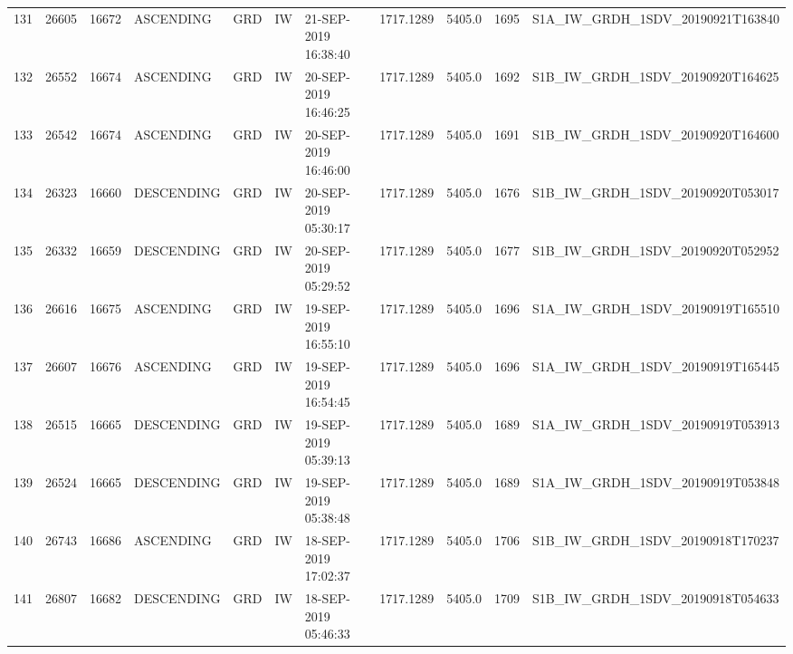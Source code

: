 \begin{tabular}{lrrllllllll}
131 &  26605 &   16672 &   ASCENDING &          GRD &              IW &  21-SEP-2019 16:38:40 &                  1717.1289 &          5405.0 &       1695 &  S1A\_IW\_GRDH\_1SDV\_20190921T163840 \\
132 &  26552 &   16674 &   ASCENDING &          GRD &              IW &  20-SEP-2019 16:46:25 &                  1717.1289 &          5405.0 &       1692 &  S1B\_IW\_GRDH\_1SDV\_20190920T164625 \\
133 &  26542 &   16674 &   ASCENDING &          GRD &              IW &  20-SEP-2019 16:46:00 &                  1717.1289 &          5405.0 &       1691 &  S1B\_IW\_GRDH\_1SDV\_20190920T164600 \\
134 &  26323 &   16660 &  DESCENDING &          GRD &              IW &  20-SEP-2019 05:30:17 &                  1717.1289 &          5405.0 &       1676 &  S1B\_IW\_GRDH\_1SDV\_20190920T053017 \\
135 &  26332 &   16659 &  DESCENDING &          GRD &              IW &  20-SEP-2019 05:29:52 &                  1717.1289 &          5405.0 &       1677 &  S1B\_IW\_GRDH\_1SDV\_20190920T052952 \\
136 &  26616 &   16675 &   ASCENDING &          GRD &              IW &  19-SEP-2019 16:55:10 &                  1717.1289 &          5405.0 &       1696 &  S1A\_IW\_GRDH\_1SDV\_20190919T165510 \\
137 &  26607 &   16676 &   ASCENDING &          GRD &              IW &  19-SEP-2019 16:54:45 &                  1717.1289 &          5405.0 &       1696 &  S1A\_IW\_GRDH\_1SDV\_20190919T165445 \\
138 &  26515 &   16665 &  DESCENDING &          GRD &              IW &  19-SEP-2019 05:39:13 &                  1717.1289 &          5405.0 &       1689 &  S1A\_IW\_GRDH\_1SDV\_20190919T053913 \\
139 &  26524 &   16665 &  DESCENDING &          GRD &              IW &  19-SEP-2019 05:38:48 &                  1717.1289 &          5405.0 &       1689 &  S1A\_IW\_GRDH\_1SDV\_20190919T053848 \\
140 &  26743 &   16686 &   ASCENDING &          GRD &              IW &  18-SEP-2019 17:02:37 &                  1717.1289 &          5405.0 &       1706 &  S1B\_IW\_GRDH\_1SDV\_20190918T170237 \\
141 &  26807 &   16682 &  DESCENDING &          GRD &              IW &  18-SEP-2019 05:46:33 &                  1717.1289 &          5405.0 &       1709 &  S1B\_IW\_GRDH\_1SDV\_20190918T054633 \\

\end{tabular}
